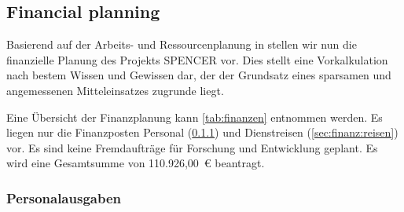 \subsection{Financial planning}
\label{sec:finanz}






Basierend auf der Arbeits- und Ressourcenplanung in  stellen wir nun die finanzielle Planung des Projekts SPENCER vor.
Dies stellt eine Vorkalkulation nach bestem Wissen und Gewissen dar, der der Grundsatz eines sparsamen und angemessenen Mitteleinsatzes zugrunde liegt.

Eine Übersicht der Finanzplanung kann \cref{tab:finanzen} entnommen werden.
Es liegen nur die Finanzposten Personal (\cref{sec:finanz:personal}) und Dienstreisen (\cref{sec:finanz:reisen}) vor.
Es sind keine Fremdaufträge für Forschung und Entwicklung geplant.
Es wird eine Gesamtsumme von 110.926,00~€ beantragt.

\subsubsection{Personalausgaben}
\label{sec:finanz:personal}

